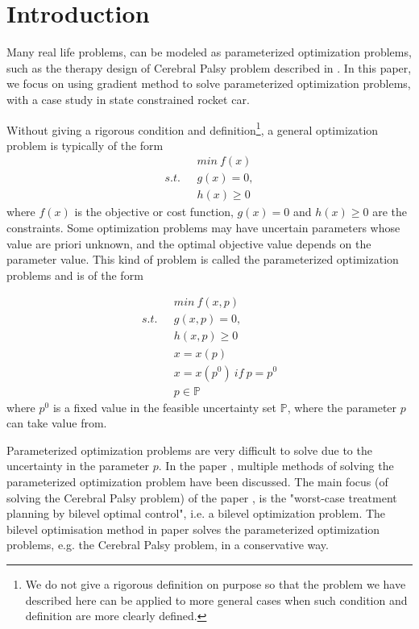 

\chapter{Introduction}

Many real life problems, can be modeled as parameterized optimization problems, such as the therapy design of Cerebral Palsy problem described in \cite{MatSch22}. In this paper, we focus on using gradient method to solve parameterized optimization problems, with a case study in state constrained rocket car. 

Without giving a rigorous condition and definition\footnote{We do not give a rigorous definition on purpose so that the problem we have described here can be applied to more general cases when such condition and definition are more clearly defined.},  a general optimization problem is typically of the form
\begin{equation}
	\begin{aligned}
		 \  \  \ & min \  f(x) \\
		s.t.  \  \  \ & g(x) = 0, \\ 
		              &  h(x)  \geq  0 
	\end{aligned}
    \label{GeneralMin}
\end{equation}
where $f(x)$ is the objective or cost function, $g(x) = 0$ and $h(x)  \geq  0$ are the constraints. Some optimization problems may have uncertain parameters whose value are priori unknown, and the optimal objective value depends on the parameter value. This kind of problem is called the parameterized optimization problems and is of the form 


\begin{equation}
	\begin{aligned}
		\  \  \ & min \  f(x, p) \\
		s.t.  \  \  \ & g(x, p) = 0, \\ 
		&  h(x,p)  \geq  0  \\ 
		& x = x(p) \\
		& x = x(p^0) \  if \  p = p^0 \\
		& p \in \mathbb{P}		
	\end{aligned}
    \label{ParaMin}
\end{equation}
where $p^0$ is a fixed value in the feasible uncertainty set $\mathbb{P}$, where the parameter $p$ can take value from.

Parameterized optimization problems are very difficult to solve due to the uncertainty in the parameter $p$. In the paper \cite{MatSch22}, multiple methods of solving the parameterized optimization problem have been discussed. The main focus (of solving the Cerebral Palsy problem) of the paper \cite{MatSch22}, is the "worst-case treatment planning by bilevel optimal control", i.e. a bilevel optimization problem. The bilevel optimisation method in paper \cite{MatSch22} solves the parameterized optimization problems, e.g. the Cerebral Palsy problem, in a conservative way.


